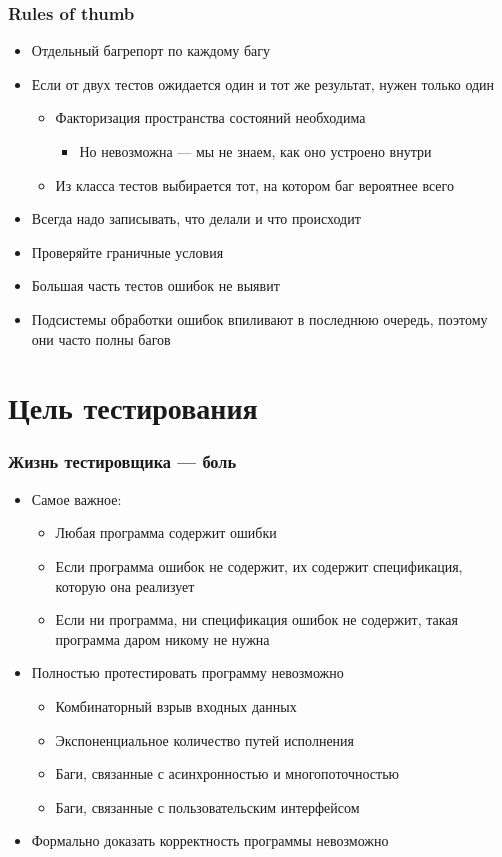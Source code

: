 \documentclass[xetex,mathserif,serif]{beamer}
\begin{document}
	\begin{frame}
		\frametitle{Rules of thumb}
		\begin{itemize}
			\item Отдельный багрепорт по каждому багу
			\item Если от двух тестов ожидается один и тот же результат, нужен только один
			\begin{itemize}
				\item Факторизация пространства состояний необходима
				\begin{itemize}
					\item Но невозможна --- мы не знаем, как оно устроено внутри
				\end{itemize}
				\item Из класса тестов выбирается тот, на котором баг вероятнее всего
			\end{itemize}
			\item Всегда надо записывать, что делали и что происходит
			\item Проверяйте граничные условия
			\item Большая часть тестов ошибок не выявит
			\item Подсистемы обработки ошибок впиливают в последнюю очередь, поэтому они часто полны багов
		\end{itemize}
	\end{frame}

	\section{Цель тестирования}

	\begin{frame}
		\frametitle{Жизнь тестировщика --- боль}
		\begin{itemize}
			\item Самое важное:
			\begin{itemize}
				\item Любая программа содержит ошибки
				\item Если программа ошибок не содержит, их содержит спецификация, которую она реализует
				\item Если ни программа, ни спецификация ошибок не содержит, такая программа даром никому не нужна
			\end{itemize}
			\item Полностью протестировать программу невозможно
			\begin{itemize}
				\item Комбинаторный взрыв входных данных
				\item Экспоненциальное количество путей исполнения
				\item Баги, связанные с асинхронностью и многопоточностью
				\item Баги, связанные с пользовательским интерфейсом
			\end{itemize}
			\item Формально доказать корректность программы невозможно
		\end{itemize}
	\end{frame}
\end{document}

